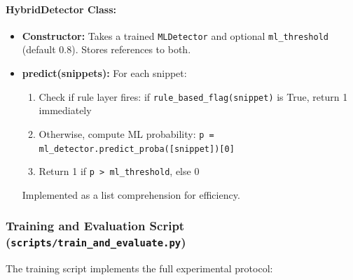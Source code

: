 \paragraph{HybridDetector Class:}
\begin{itemize}
  \item \textbf{Constructor:} Takes a trained \texttt{MLDetector} and optional \texttt{ml\_threshold} (default 0.8). Stores references to both.
  
  \item \textbf{predict(snippets):} For each snippet:
  \begin{enumerate}
    \item Check if rule layer fires: if \texttt{rule\_based\_flag(snippet)} is True, return 1 immediately
    \item Otherwise, compute ML probability: \texttt{p = ml\_detector.predict\_proba([snippet])[0]}
    \item Return 1 if \texttt{p > ml\_threshold}, else 0
  \end{enumerate}
  Implemented as a list comprehension for efficiency.
\end{itemize}

\subsubsection{Training and Evaluation Script (\texttt{scripts/train\_and\_evaluate.py})}

The training script implements the full experimental protocol:

